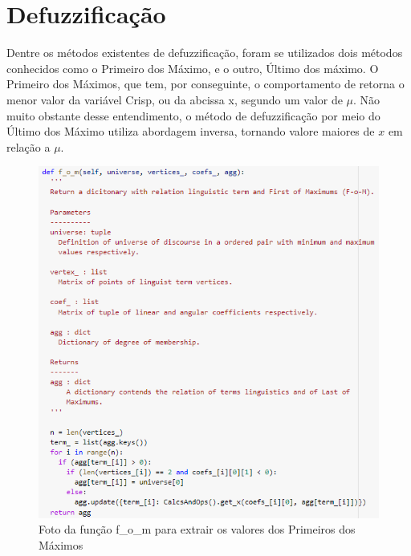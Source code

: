 \documentclass[courier]{uninove-ppgi}
\begin{document}
		\section{Defuzzificação}
		
			 Dentre os métodos existentes de defuzzificação, foram se utilizados dois métodos conhecidos como o Primeiro dos Máximo, e o outro, Último dos máximo. O Primeiro dos Máximos, que tem, por conseguinte, o comportamento de retorna o menor valor da variável Crisp, ou da abcissa x,  segundo um valor de $\mu$. Não muito obstante desse entendimento, o método de defuzzificação por meio do Último dos Máximo utiliza abordagem inversa, tornando valore maiores de $x$ em relação a $\mu$.
			 
		     \begin{figure}[ht!]
    
        	    \begin{center}
        	
        		    \includegraphics[scale=1.1]{f_o_m}
        	
        	    \end{center}
        	
        	    \caption{Foto da função f_o_m para extrair os valores dos Primeiros dos Máximos}
        	
        	
            \end{figure}
			 
\end{document}
